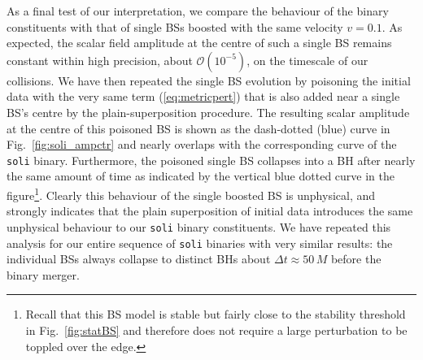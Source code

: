 \documentclass[11pt]{report}  %
\begin{document}
As a final test of our interpretation, we compare the behaviour
of the binary constituents with that of single BSs boosted with the
same velocity $v=0.1$. As expected, the scalar field amplitude at
the centre of such a single BS remains constant within high precision,
about $\mathcal{O}(10^{-5})$, on the timescale of our collisions.
We have then repeated the single BS evolution by poisoning the initial
data with the very same term (\ref{eq:metricpert}) that is also
added near a single BS's centre by the plain-superposition procedure.
The resulting scalar amplitude at the centre of this poisoned
BS is shown as the dash-dotted (blue) curve in
Fig.~\ref{fig:soli_ampctr} and nearly overlaps with the corresponding
curve of the {\tt soli} binary. Furthermore, the poisoned single
BS collapses into a BH after nearly the same amount of time as indicated
\setcounter{footnote}{4}
by the vertical blue dotted curve in the figure\footnote{
Recall that this BS model is stable but fairly close
to the stability threshold in Fig.~\ref{fig:statBS}
and therefore does not require a large perturbation to be
toppled over the edge.}.
Clearly this
behaviour of the single boosted BS is unphysical, and strongly
indicates that the plain superposition of initial data introduces
the same unphysical behaviour to our {\tt soli} binary constituents.
We have repeated this analysis for our entire sequence of
{\tt soli} binaries with very similar results: the individual
BSs always collapse to distinct BHs about $\Delta t\approx 50\,M$
before the binary merger.
\end{document}
